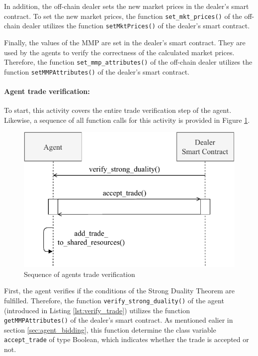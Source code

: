 In addition, the off-chain dealer sets the new market prices in the dealer's smart contract.
To set the new market prices, the function \verb|set_mkt_prices()| of the off-chain dealer 
utilizes the function \verb|setMktPrices()| of the dealer's smart contract.

Finally, the values of the MMP are set in the dealer's smart contract. 
They are used by the agents to verify the correctness of the calculated market prices.
Therefore, the function \verb|set_mmp_attributes()| of the off-chain dealer
utilizes the function \verb|setMMPAttributes()| of the dealer's smart contract.

\paragraph{Agent trade verification:}
To start, this activity covers the entire trade verification step of the agent. 
Likewise, a sequence of all function 
calls for this activity is provided in Figure \ref{figure:agents_trade_verification}.

\begin{figure}[htbp]
	\centering
	\includegraphics[width=.8\linewidth]{./figures/trade_verification.pdf}
	\caption{Sequence of agents trade verification}
	\label{figure:agents_trade_verification}
\end{figure}

First, the agent verifies if the conditions of the Strong Duality Theorem
are fulfilled.
Therefore, the function \verb|verify_strong_duality()| of the agent
(introduced in Listing \ref{lst:verify_trade})
utilizes the function \verb|getMMPAttributes()| of the dealer's smart contract.
As mentioned ealier in section \ref{sec:agent_bidding}, this function 
determine the class variable \verb|accept_trade| of type Boolean,
which indicates whether the trade is accepted or not.

